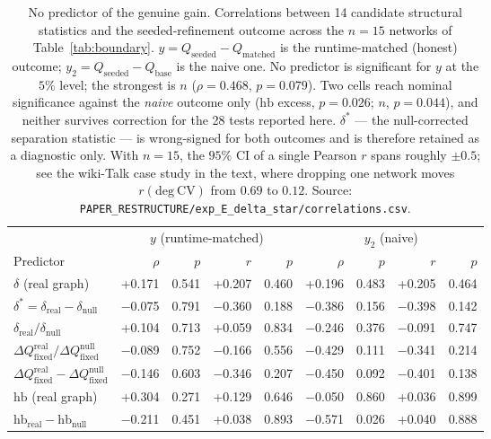 \begin{table}[t]
\centering
\setlength{\tabcolsep}{5pt}
\caption{No predictor of the genuine gain. Correlations between 14 candidate structural statistics
and the seeded-refinement outcome across the $n=15$ networks of Table~\ref{tab:boundary}.
$y = Q_{\mathrm{seeded}} - Q_{\mathrm{matched}}$ is the runtime-matched (honest) outcome;
$y_2 = Q_{\mathrm{seeded}} - Q_{\mathrm{base}}$ is the naive one. No predictor is significant for
$y$ at the $5\%$ level; the strongest is $n$ ($\rho=0.468$, $p=0.079$). Two cells reach nominal
significance against the \emph{naive} outcome only ($\mathrm{hb}$ excess, $p=0.026$; $n$, $p=0.044$), and
neither survives correction for the 28 tests reported here. $\delta^{\ast}$ --- the null-corrected
separation statistic --- is wrong-signed for both outcomes and is therefore retained as a diagnostic
only. With $n=15$, the $95\%$ CI of a single Pearson $r$ spans roughly $\pm 0.5$; see the wiki-Talk
case study in the text, where dropping one network moves $r(\mathrm{deg\ CV})$ from $0.69$ to $0.12$.
Source: \texttt{PAPER\_RESTRUCTURE/exp\_E\_delta\_star/correlations.csv}.}
\label{tab:predictors}
\footnotesize
\begin{tabular}{lrrrrrrrr}
\toprule
 & \multicolumn{4}{c}{$y$ (runtime-matched)} & \multicolumn{4}{c}{$y_2$ (naive)} \\
\cmidrule(lr){2-5}\cmidrule(lr){6-9}
Predictor & $\rho$ & $p$ & $r$ & $p$ & $\rho$ & $p$ & $r$ & $p$ \\
\midrule
$\delta$ (real graph) & +0.171 & 0.541 & +0.207 & 0.460 & +0.196 & 0.483 & +0.205 & 0.464 \\
$\delta^{\ast}=\delta_{\mathrm{real}}-\delta_{\mathrm{null}}$ & $-$0.075 & 0.791 & $-$0.360 & 0.188 & $-$0.386 & 0.156 & $-$0.398 & 0.142 \\
$\delta_{\mathrm{real}}/\delta_{\mathrm{null}}$ & +0.104 & 0.713 & +0.059 & 0.834 & $-$0.246 & 0.376 & $-$0.091 & 0.747 \\
$\Delta Q_{\mathrm{fixed}}^{\mathrm{real}}/\Delta Q_{\mathrm{fixed}}^{\mathrm{null}}$ & $-$0.089 & 0.752 & $-$0.166 & 0.556 & $-$0.429 & 0.111 & $-$0.341 & 0.214 \\
$\Delta Q_{\mathrm{fixed}}^{\mathrm{real}}-\Delta Q_{\mathrm{fixed}}^{\mathrm{null}}$ & $-$0.146 & 0.603 & $-$0.346 & 0.207 & $-$0.450 & 0.092 & $-$0.401 & 0.138 \\
$\mathrm{hb}$ (real graph) & +0.304 & 0.271 & +0.129 & 0.646 & $-$0.050 & 0.860 & +0.036 & 0.899 \\
$\mathrm{hb}_{\mathrm{real}}-\mathrm{hb}_{\mathrm{null}}$ & $-$0.211 & 0.451 & +0.038 & 0.893 & $-$0.571 & 0.026 & +0.040 & 0.888 \\

\end{tabular}
\end{table}
